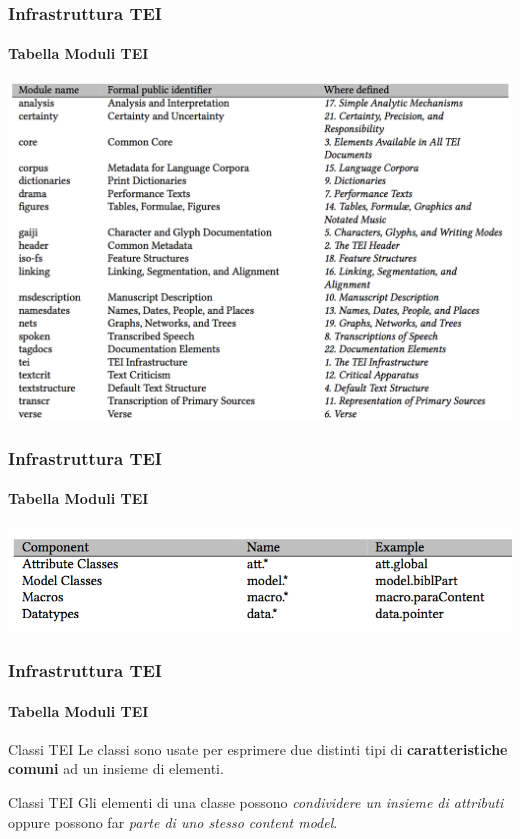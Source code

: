 \begin{frame}
    \frametitle{Infrastruttura TEI}
    \framesubtitle{Tabella Moduli TEI}
    \addtocounter{nframe}{1}
    
        \begin{center}
        \includegraphics[width=.95\textwidth]{imgs/ModuliTEI.png}
        \end{center}
   
\end{frame}

\begin{frame}
    \frametitle{Infrastruttura TEI}
    \framesubtitle{Tabella Moduli TEI}
    \addtocounter{nframe}{1}
        \begin{center}
        \includegraphics[width=.95\textwidth]{imgs/ModelloTEI.png}
        \end{center}
\end{frame}

\begin{frame}
    \frametitle{Infrastruttura TEI}
    \framesubtitle{Tabella Moduli TEI}
    \addtocounter{nframe}{1}
    
    \begin{block}{Classi TEI}
        Le classi sono usate per esprimere due distinti tipi di \textbf{caratteristiche comuni} ad un insieme di elementi. 
    \end{block}

    \begin{block}{Classi TEI}
        Gli elementi di una classe possono \textit{condividere un insieme di attributi} oppure possono far \textit{parte di uno stesso content model}.
    \end{block}
\end{frame}

